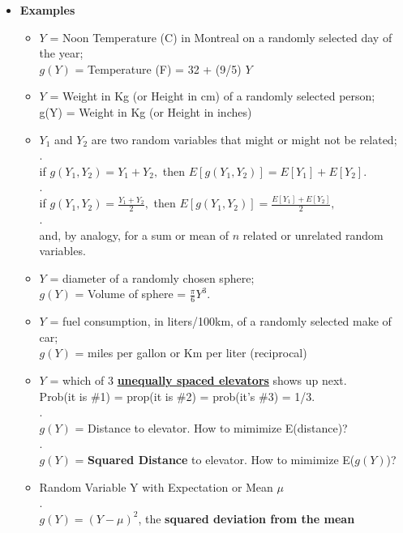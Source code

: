 \documentclass[]{book}
\begin{document}
\begin{itemize}
\item
  \textbf{Examples}

  \begin{itemize}
  \item
    \(Y\) = Noon Temperature (C) in Montreal on a randomly selected day of the year;\\
    \(g(Y)\) = Temperature (F) = 32 + (9/5) \(Y\)
  \item
    \(Y\) = Weight in Kg (or Height in cm) of a randomly selected person;\\
    g(Y) = Weight in Kg (or Height in inches)
  \item
    \(Y_1\) and \(Y_2\) are two random variables that might or might not be related;\\
    .\\
    if \(g(Y_1, Y_2) = Y_1 + Y_2,\) then \(E[g(Y_1, Y_2)] = E[Y_1] + E[Y_2].\)\\
    .\\
    if \(g(Y_1, Y_2) = \frac{Y_1 + Y_2}{2},\) then \(E[g(Y_1, Y_2)] = \frac{E[Y_1] + E[Y_2]}{2},\)\\
    .\\
    and, by analogy, for a sum or mean of \(n\) related or unrelated random variables.
  \item
    \(Y\) = diameter of a randomly chosen sphere;\\
    \(g(Y)\) = Volume of sphere = \(\frac{\pi}{6} Y^3.\)
  \item
    \(Y\) = fuel consumption, in liters/100km, of a randomly selected make of car;\\
    \(g(Y)\) = miles per gallon or Km per liter (reciprocal)
  \item
    \(Y\) = which of 3 \href{http://www.medicine.mcgill.ca/epidemiology/hanley/Reprints/median-elevator.pdf}{\textbf{unequally spaced elevators}} shows up next.\\
    Prob(it is \#1) = prop(it is \#2) = prob(it's \#3) = 1/3.\\
    .\\
    \(g(Y)\) = Distance to elevator. How to mimimize E(distance)?\\
    .\\
    \(g(Y)\) = \textbf{Squared Distance} to elevator. How to mimimize E(\(g(Y)\))?
  \item
    Random Variable Y with Expectation or Mean \(\mu\)\\
    .\\
    \(g(Y) = (Y - \mu)^2\), the \textbf{squared deviation from the mean}
  \end{itemize}
\end{itemize}
\end{document}
